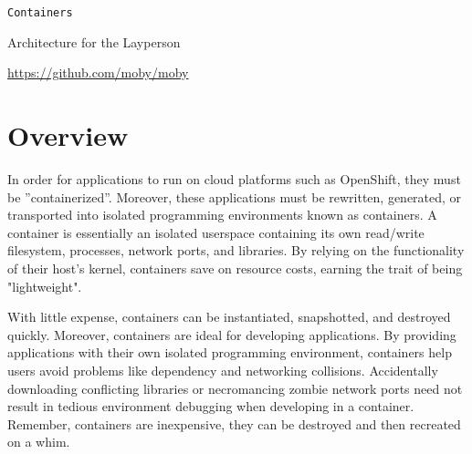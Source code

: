 \documentclass{article}
\begin{document}
      
\centerline{\texttt{Containers}}
\centerline{\sc Architecture for the Layperson }
\centerline{\url{https://github.com/moby/moby}}

\vspace{1pc}
\section{Overview}

\hspace{3pc} 
In order for applications to run on cloud platforms such as OpenShift, they must be ”containerized”. 
Moreover, these applications must be rewritten, generated, or transported into isolated programming 
environments known as containers. A container is essentially an isolated userspace containing its 
own read/write filesystem, processes, network ports, and libraries. By relying on the functionality 
of their host's kernel, containers save on resource costs, earning the trait of being "lightweight".
\begin{figure}
\end{figure}

With little expense, containers can be instantiated, snapshotted, and destroyed quickly. Moreover, 
containers are 
ideal for developing applications. By providing applications with their own isolated programming 
environment, containers help users avoid problems like dependency and networking collisions. 
Accidentally downloading conflicting libraries or necromancing zombie network ports need not result 
in tedious environment debugging when developing in a container. Remember, containers are inexpensive,
 they can be destroyed and then recreated on a whim. 
\end{document}
